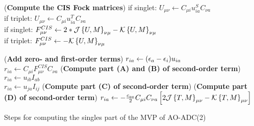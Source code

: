 \begin{algorithm}
\Substep(\textbf{Compute the CIS Fock matrices}){
if singlet: $U_{\mu\nu} \leftarrow C_{\mu i} u^S_{ia} C_{\nu a}$
\\
if triplet: $U_{\mu\nu} \leftarrow C_{\mu i} u^T_{ia} C_{\nu a}$
\\
if singlet: $F^{CIS}_{\mu\nu} \leftarrow 2 * \mathcal{J}\left\lbrace U,M \right\rbrace_{\nu\mu} - \mathcal{K}\left\lbrace U,M \right\rbrace_{\nu\mu}$
\\
if triplet: $F^{CIS}_{\mu\nu} \leftarrow - \mathcal{K}\left\lbrace U,M \right\rbrace_{\nu\mu}$
}

\Substep(\textbf{Add zero- and first-order terms}){
$r_{ia} \leftarrow (\epsilon_a - \epsilon_i) u_{ia}$
\\
$r_{ia} \leftarrow C_{\mu i} F^{CIS}_{\mu\nu} C_{\nu a}$
}
%
\Substep(\textbf{Compute part (A) and (B) of second-order term}){
$r_{ia} \leftarrow u_{ib} I_{ab}$
\\
$r_{ia} \leftarrow u_{ja} I_{ij}$
}
%
\Substep(\textbf{Compute part (C) of second-order term}){
} %
%
\Substep(\textbf{Compute part (D) of second-order term}){
%
$r_{ia} \leftarrow -\frac{c_{os}}{2} C_{\mu i} C_{\nu a} \left[ 2\mathcal{J}\left\lbrace T,M \right\rbrace_{\mu\nu} - \mathcal{K}\left\lbrace T,M \right\rbrace_{\mu\nu} \right]$
} %
\caption{Steps for computing the singles part of the MVP of AO-ADC(2)}
\label{AODFSOSADC21D}
\end{algorithm}

